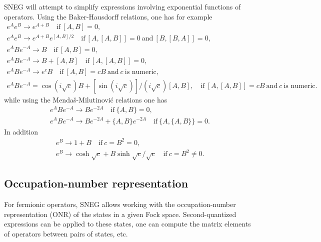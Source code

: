 \documentclass[3p,number,preprint]{elsarticle}
\begin{document}
SNEG will attempt to simplify expressions involving exponential
functions of operators. Using the Baker-Hausdorff relations, one has
for example
%
\begin{equation}
\begin{split}
e^A e^B \to e^{A+B} \quad \text{if}\ [A,B]=0,\\
e^A e^B \to e^{A+B} e^{[A,B]/2} \quad \text{if}\ [A,[A,B]]=0
\ \text{and}\ [B,[B,A]]=0,\\
e^A B e^{-A} \to B \quad \text{if}\ [A,B]=0,\\
e^A B e^{-A} \to B + [A,B] \quad \text{if}\ [A,[A,B]]=0,\\
e^A B e^{-A} \to e^c B \quad \text{if}\ [A,B]=cB\ \text{and}\ c\
\text{is numeric},\\
e^A B e^{-A} = \cos(i \sqrt{c}) B + \left[\sin(i \sqrt{c})\right]/(i
\sqrt{c})  [A,B],
\quad \text{if}\ [A,[A,B]]=cB\ \text{and}\ c\ \text{is numeric}.
\end{split}
\end{equation}
%
while using the Menda\v{s}-Milutinovi\'c relations \cite{mendas1989}
one has
%
\begin{equation}
\begin{split}
e^A B e^{-A} \to B e^{-2A} \quad \text{if}\ \{A,B\}=0, \\
e^A B e^{-A} \to B e^{-2A} + \{A,B\} e^{-2A} \quad 
\text{if}\ \{A,\{A,B\}\}=0.
\end{split}
\end{equation}
%
In addition
%
\begin{equation}
\begin{split}
e^B \to 1+B \quad \text{if}\ c=B^2=0,\\
e^B \to \cosh{\sqrt{c}} + B \sinh{\sqrt{c}}/\sqrt{c}
\quad \text{if}\ c=B^2\neq0.
\end{split}
\end{equation}


\subsection{Occupation-number representation}

For fermionic operators, SNEG allows working with the
occupation-number representation (ONR) of the states in a given Fock
space. Second-quantized expressions can be applied to these states,
one can compute the matrix elements of operators between pairs of
states, etc.
\end{document}
